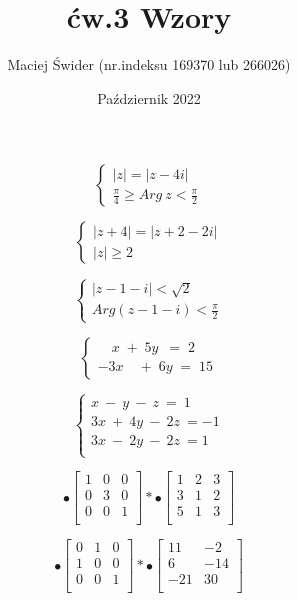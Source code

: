 \documentclass[12pt, letterpaper, titlepage]{article}
\title{ćw.3 Wzory}
\author{Maciej Świder (nr.indeksu 169370 lub 266026)}
\date{Październik 2022}
\begin{document}
$$ \left\{ \begin{array}{c}
|z|=|z-4i|\\
\frac{\pi}{4} \geq Arg \ z < \frac{\pi}{2}
\end{array}
\right.$$

$$ \left\{ \begin{array}{c}
|z+4| = |z+2-2i|\\
|z| \geq 2					

\end{array}
\right.$$

$$ \left\{ \begin{array}{c}
|z-1-i| < \sqrt{2}\\
Arg(z-1-i) < \frac{\pi}{2}

\end{array}
\right.$$

$$ \left\{ \begin{array}{cc}
\quad x\; +\;5y\;\ =\;2 \\
-3x\quad+\;6y\;=\;15				

\end{array}
\right.$$


$$ \left\{ \begin{array}{lll}
x\ - \ y\ -\ z\ =\ 1 \\
3x\ + \ 4y\ -\ 2z\ =-1 \\
3x \ - \ 2y\ -\ 2z\ = 1 \\
\end{array}
\right.$$

$$ \mathbf{•}
\left[\begin{array}{ccc}
1 & 0 & 0 \\
0 & 3 & 0 \\
0 & 0 & 1 \\
\end{array} \right] * 
\mathbf{•}
\left[\begin{array}{ccc}
1 & 2 & 3 \\
3 & 1 & 2 \\
5 & 1 & 3 \\
\end{array} \right]
$$

$$ \mathbf{•}
\left[\begin{array}{ccc}
0 & 1 & 0 \\
1 & 0 & 0 \\
0 & 0 & 1 \\
\end{array} \right] * 
\mathbf{•}
\left[\begin{array}{cc}
11 & -2 \\
6  & -14 \\
-21 & 30 \\
\end{array} \right]
$$
\end{document}
